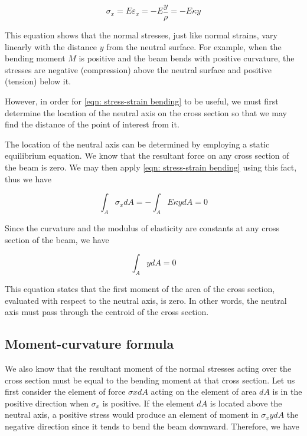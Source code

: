 \documentclass[
10pt,
a4paper,
openany,
svgnames,
]{book} %
\begin{document}
\begin{equation} \label{eqn: stress-strain bending}
  {\sigma _x} = E{\varepsilon _x} =  - E\frac{y}{\rho } =  - E\kappa y
\end{equation}

This equation shows that the normal stresses, just like normal strains, vary linearly with the distance $y$ from the neutral surface. For example, when the bending moment $M$ is positive and the beam bends with positive curvature, the stresses are negative (compression) above the neutral surface and positive (tension) below it.

However, in order for \cref{eqn: stress-strain bending} to be useful, we must first determine the location of the neutral axis on the cross section so that we may find the distance of the point of interest from it.

The location of the neutral axis can be determined by employing a static equilibrium equation. We know that the resultant force on any cross section of the beam is zero. We may then apply \cref{eqn: stress-strain bending} using this fact, thus we have

\[\int_A {{\sigma _x}dA}  =  - \int_A {E\kappa ydA}  = 0\]

Since the curvature and the modulus of elasticity are constants at any cross section of the beam, we have

\begin{equation}
  \int_A {ydA}  = 0
\end{equation}

This equation states that the first moment of the area of the cross section, evaluated with respect to the neutral axis, is zero. In other words, the neutral axis must pass through the centroid of the cross section.

\subsection{Moment-curvature formula}

We also know that the resultant moment of the normal stresses acting over the cross section must be equal to the bending moment at that cross section. Let us first consider the element of force $\sigma xdA$ acting on the element of area $dA$ is in the positive direction when $\sigma_x$ is positive. If the element $dA$ is located above the neutral axis, a positive stress would produce an element of moment in $\sigma_xydA$ the negative direction since it tends to bend the beam downward. Therefore, we have
\end{document}
